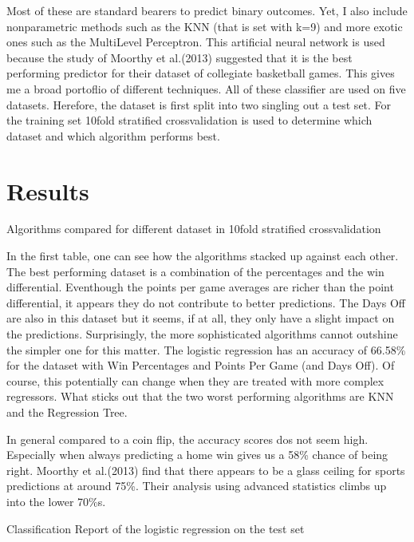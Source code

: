 \documentclass[11pt,a4paper,leqno]{article}
\begin{document}
Most of these are standard bearers to predict binary outcomes. Yet, I also include non\-parametric methods such as the KNN (that is set with k=9) and more exotic ones such as the Multi\-Level Perceptron. This artificial neural network is used because the study of Moorthy et al.(2013) suggested that it is the best performing predictor for their dataset of collegiate basketball games. This gives me a broad portoflio of different techniques. All of these classifier are used on five datasets. Herefore, the dataset is first split into two \- singling out a test set. For the training set 10\-fold stratified cross\-validation is used to determine which dataset and which algorithm performs best.

\section{Results}

\begin{table}

\caption{Algorithms compared for different dataset in 10\-fold stratified cross\-validation}
    

 \end{table}

In the first table, one can see how the algorithms stacked up against each other. The best performing dataset is a combination of the percentages and the win differential. Eventhough the points per game averages are richer than the point differential, it appears they do not contribute to better predictions. The Days Off are also in this dataset but it seems, if at all, they only have a slight impact on the predictions. Surprisingly, the more sophisticated algorithms cannot outshine the simpler one for this matter. The logistic regression has an accuracy of 66.58\% for the dataset with Win Percentages and Points Per Game (and Days Off). Of course, this potentially can change when they are treated with more complex regressors. What sticks out that the two worst performing algorithms are KNN and the Regression Tree.

In general compared to a coin flip, the accuracy scores dos not seem high. Especially when always predicting a home win gives us a 58\% chance of being right. Moorthy et al.(2013) find that there appears to be a glass ceiling for sports predictions at around 75\%. Their analysis using advanced statistics climbs up into the lower 70\%s.

\begin{table}

\caption{Classification Report of the logistic regression on the test set}
\centering
    

   \end{table}
\end{document}

